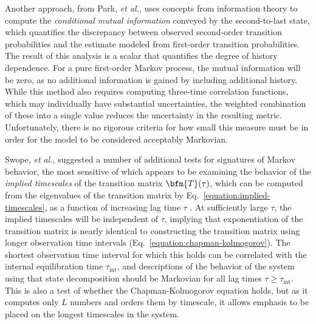 Another approach, from Park, \emph{et al.}, \cite{park:2006a} uses concepts from information theory to compute the \emph{conditional mutual information} conveyed by the second-to-last state, which quantifies the discrepancy between observed second-order transition probabilities and the estimate modeled from first-order transition probabilities.
The result of this analysis is a scalar that quantifies the degree of history dependence.  
For a pure first-order Markov process, the mutual information will be zero, as no additional information is gained by including additional history.
While this method also requires computing three-time correlation functions, which may individually have substantial uncertainties, the weighted combination of these into a single value reduces the uncertainty in the resulting metric.
Unfortunately, there is no rigorous criteria for how small this measure must be in order for the model to be considered acceptably Markovian.

Swope, \emph{et al.}, \cite{swope:2004a} suggested a number of additional tests for signatures of Markov behavior, the most sensitive of which appears to be examining the behavior of the \emph{implied timescales} of the transition matrix $\bfm{T}(\tau)$, which can be computed from the eigenvalues of the transition matrix by Eq.\ \ref{equation:implied-timescales}, as a function of increasing lag time $\tau$ \cite{chodera:jpcb:2006}.
At sufficiently large $\tau$, the implied timescales will be independent of $\tau$, implying that exponentiation of the transition matrix is nearly identical to constructing the transition matrix using longer observation time intervals (Eq.\ \ref{equation:chapman-kolmogorov}).
The shortest observation time interval for which this holds can be correlated with the internal equilibration time $\tau_\mathrm{int}$, and descriptions of the behavior of the system using that state decomposition should be Markovian for all lag times $\tau \ge \tau_\mathrm{int}$.
This is also a test of whether the Chapman-Kolmogorov equation holds, but as it computes only $L$ numbers and orders them by timescale, it allows emphasis to be placed on the longest timescales in the system.

